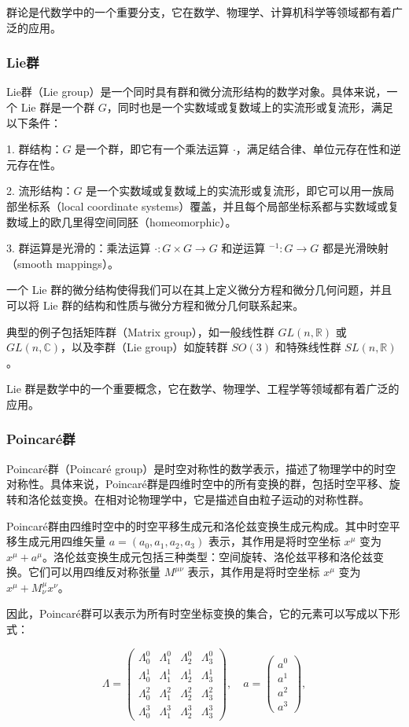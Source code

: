 \documentclass[UTF8,a4paper,11pt]{article}
\begin{document}
群论是代数学中的一个重要分支，它在数学、物理学、计算机科学等领域都有着广泛的应用。
\subsubsection{Lie群}
Lie群（Lie group）是一个同时具有群和微分流形结构的数学对象。具体来说，一个 Lie 群是一个群 $G$，同时也是一个实数域或复数域上的实流形或复流形，满足以下条件：

1. 群结构：$G$ 是一个群，即它有一个乘法运算 $\cdot$，满足结合律、单位元存在性和逆元存在性。

2. 流形结构：$G$ 是一个实数域或复数域上的实流形或复流形，即它可以用一族局部坐标系（local coordinate systems）覆盖，并且每个局部坐标系都与实数域或复数域上的欧几里得空间同胚（homeomorphic）。

3. 群运算是光滑的：乘法运算 $\cdot : G \times G \rightarrow G$ 和逆运算 $^{-1} : G \rightarrow G$ 都是光滑映射（smooth mappings）。

一个 Lie 群的微分结构使得我们可以在其上定义微分方程和微分几何问题，并且可以将 Lie 群的结构和性质与微分方程和微分几何联系起来。

典型的例子包括矩阵群（Matrix group），如一般线性群 $GL(n,\mathbb{R})$ 或 $GL(n,\mathbb{C})$，以及李群（Lie group）如旋转群 $SO(3)$ 和特殊线性群 $SL(n,\mathbb{R})$。

Lie 群是数学中的一个重要概念，它在数学、物理学、工程学等领域都有着广泛的应用。
\subsubsection{Poincaré群}
Poincaré群（Poincaré group）是时空对称性的数学表示，描述了物理学中的时空对称性。具体来说，Poincaré群是四维时空中的所有变换的群，包括时空平移、旋转和洛伦兹变换。在相对论物理学中，它是描述自由粒子运动的对称性群。

Poincaré群由四维时空中的时空平移生成元和洛伦兹变换生成元构成。其中时空平移生成元用四维矢量 $a=(a_0,a_1,a_2,a_3)$ 表示，其作用是将时空坐标 $x^\mu$ 变为 $x^\mu+a^\mu$。洛伦兹变换生成元包括三种类型：空间旋转、洛伦兹平移和洛伦兹变换。它们可以用四维反对称张量 $M^{\mu\nu}$ 表示，其作用是将时空坐标 $x^\mu$ 变为 $x^\mu+M^\mu_\nu x^\nu$。

因此，Poincaré群可以表示为所有时空坐标变换的集合，它的元素可以写成以下形式：

$$
\Lambda = \begin{pmatrix} \Lambda^0_0 & \Lambda^0_1 & \Lambda^0_2 & \Lambda^0_3 \\ \Lambda^1_0 & \Lambda^1_1 & \Lambda^1_2 & \Lambda^1_3 \\ \Lambda^2_0 & \Lambda^2_1 & \Lambda^2_2 & \Lambda^2_3 \\ \Lambda^3_0 & \Lambda^3_1 & \Lambda^3_2 & \Lambda^3_3 \end{pmatrix},
\quad
a = \begin{pmatrix} a^0 \\ a^1 \\ a^2 \\ a^3 \end{pmatrix},
$$
\end{document}
